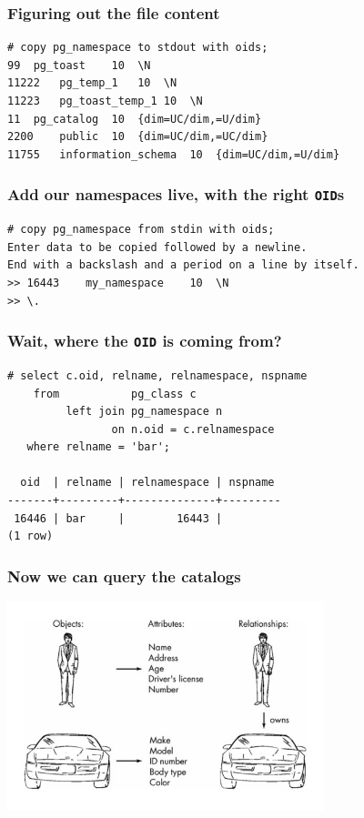 \documentclass{beamer}
\begin{document}
\begin{frame}[fragile=singleslide]
  \frametitle{Figuring out the file content}
  
  \begin{verbatim}
# copy pg_namespace to stdout with oids;
99	pg_toast	10	\N
11222	pg_temp_1	10	\N
11223	pg_toast_temp_1	10	\N
11	pg_catalog	10	{dim=UC/dim,=U/dim}
2200	public	10	{dim=UC/dim,=UC/dim}
11755	information_schema	10	{dim=UC/dim,=U/dim}
  \end{verbatim}
\end{frame}

\begin{frame}[fragile=singleslide]
  \frametitle{Add our namespaces live, with the right \texttt{OID}s}
  
  \begin{verbatim}
# copy pg_namespace from stdin with oids;
Enter data to be copied followed by a newline.
End with a backslash and a period on a line by itself.
>> 16443	my_namespace	10	\N
>> \.
  \end{verbatim}
\end{frame}

\begin{frame}[fragile]
  \frametitle{Wait, where the \texttt{OID} is coming from?}
  
  \begin{verbatim}
# select c.oid, relname, relnamespace, nspname
    from           pg_class c
         left join pg_namespace n
                on n.oid = c.relnamespace
   where relname = 'bar';

  oid  | relname | relnamespace | nspname 
-------+---------+--------------+---------
 16446 | bar     |        16443 | 
(1 row)
  \end{verbatim}
\end{frame}

\begin{frame}[fragile]
  \frametitle{Now we can query the catalogs}

  \vfill
  
  \begin{center}
    \includegraphics[height=2.4in]{relation-attributes.jpg}
  \end{center}
\end{frame}
\end{document}
